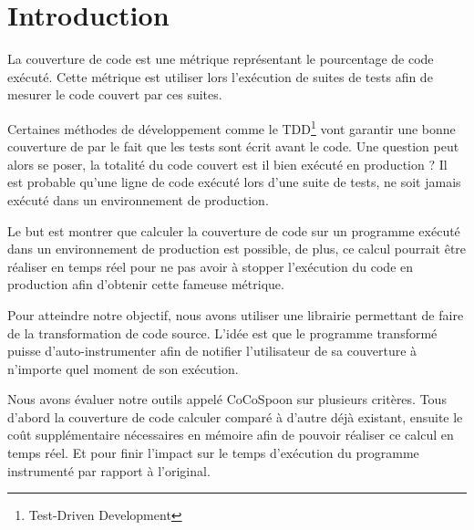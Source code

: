 \chapter*{Introduction}
	\thispagestyle{introduction}

La couverture de code est une métrique représentant le pourcentage de code exécuté. Cette métrique est utiliser lors l'exécution de suites de tests afin de mesurer le code couvert par ces suites. 

Certaines méthodes de développement comme le TDD\footnote{Test-Driven Development} vont garantir une bonne couverture de par le fait que les tests sont écrit avant le code. Une question peut alors se poser, la totalité du code couvert est il bien exécuté en production ? Il est probable qu’une ligne de code exécuté lors d’une suite de tests, ne soit jamais exécuté dans un environnement de production. 

Le but est montrer que calculer la couverture de code sur un programme exécuté dans un environnement de production est possible, de plus, ce calcul pourrait être réaliser en temps réel pour ne pas avoir à stopper l’exécution du code en production afin d’obtenir cette fameuse métrique.

Pour atteindre notre objectif, nous avons utiliser une librairie permettant de faire de la transformation de code source. L’idée est que le programme transformé puisse d’auto-instrumenter afin de notifier l’utilisateur de sa couverture à n'importe quel moment de son exécution.

Nous avons évaluer notre outils appelé CoCoSpoon sur plusieurs critères. Tous d’abord la couverture de code calculer comparé à d’autre déjà existant, ensuite le coût supplémentaire nécessaires en mémoire afin de pouvoir réaliser ce calcul en temps réel. Et pour finir l’impact sur le temps d’exécution du programme instrumenté par rapport à l’original.

